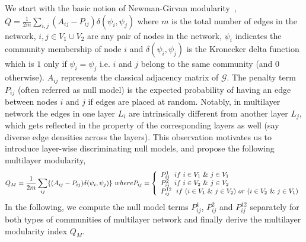 We start with the basic notion of Newman-Girvan modularity~\cite{newman2006modularity},
$Q = \frac{1}{2m}\sum_{i,j} (A_{ij} - P_{ij})\delta(\psi_i,\psi_j)$ where $m$
is the total number of edges in the network, $i,j \in V_1 \cup V_2$ are any pair of nodes in the
network, $\psi_i$ indicates the community membership of node $i$ and $\delta(\psi_i,\psi_j)$ is the Kronecker delta function which
is $1$ only if $\psi_i=\psi_j$ i.e. $i$ and $j$ belong to the same community (and $0$ otherwise).
$A_{ij}$ represents the classical adjacency matrix of $\mathcal{G}$. The penalty term $P_{ij}$ (often referred as null model)
is the expected probability of having an edge between nodes $i$ and $j$ if edges are placed at random.
Notably, in multilayer network the edges in one layer $L_i$ are intrinsically different from another layer $L_j$, which gets
reflected in the property of the corresponding layers as well (say diverse edge densities across the layers). This observation motivates
us to introduce layer-wise discriminating null models, and propose the following
multilayer modularity, %
\vspace{-0.1in}
\begin{dmath}\label{eq11}
{Q_M = \frac{1}{2m}\sum_{ij}\{(A_{ij}-P_{ij})\delta(\psi_i,\psi_j)\} ~where}\\
{P_{ij}=\left\{ \begin{array}{ll}
                  P^1_{ij}~~if~i \in V_1~\&~j \in V_1\\
                  P^2_{ij}~~if~i \in V_2~\&~j \in V_2\\
                  P^{12}_{ij}~~if~(i \in V_1~\&~j \in V_2)~or~(i \in V_2~\&~j \in V_1)
                \end{array}
              \right.}
\end{dmath}
\vspace{-0.15in}
In the following, we compute the null model terms $P^1_{ij}$, $P^2_{ij}$ and $P^{12}_{ij}$ separately for both types
of communities of multilayer network and finally derive the multilayer modularity index $Q_M$.

